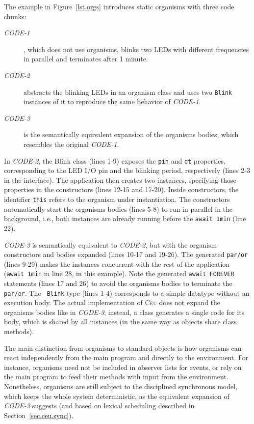 \documentclass{sigplanconf}
\newcommand{\CEU}{\textsc{C\'{e}u}\xspace}
\newcommand{\code}[1] {{\small{\texttt{#1}}}}
\newcommand{\1}{\;}
\newcommand{\2}{\;\;}
\newcommand{\3}{\;\;\;}
\newcommand{\5}{\;\;\;\;\;}
\begin{document}
The example in Figure~\ref{lst.orgs} introduces static organisms with three 
code chunks:
%
\begin{description}
\item[\emph{CODE-1}], which does not use organisms, blinks two LEDs with 
different frequencies in parallel and terminates after 1 minute.
%
\item[\emph{CODE-2}] abstracts the blinking LEDs in an organism class and uses 
two \code{Blink} instances of it to reproduce the same behavior of 
\emph{CODE-1}.
%
\item[\emph{CODE-3}] is the semantically equivalent expansion of the organisms 
bodies, which resembles the original \emph{CODE-1}.
\end{description}
%
In \emph{CODE-2}, the Blink class (lines 1-9) exposes the \code{pin} and 
\code{dt} properties, corresponding to the LED I/O pin and the blinking period, 
respectively (lines 2-3 in the interface).
The application then creates two instances, specifying those properties in the 
constructors (lines 12-15 and 17-20).
Inside constructors, the identifier \code{this} refers to the organism under 
instantiation.
The constructors automatically start the organisms bodies (lines 5-8) to run in 
parallel in the background, i.e., both instances are already running before the 
\code{await 1min} (line 22).

\emph{CODE-3} is semantically equivalent to \emph{CODE-2}, but with the 
organism constructors and bodies expanded (lines 10-17 and 19-26).
The generated \code{par/or} (lines 9-29) makes the instances concurrent with 
the rest of the application (\code{await 1min} in line 28, in this example).
Note the generated \code{await FOREVER} statements (lines 17 and 26) to avoid 
the organisms bodies to terminate the \code{par/or}.
The \code{\_Blink} type (lines 1-4) corresponds to a simple datatype without an
execution body.
%
The actual implementation of \CEU does not expand the organisms bodies like in 
\emph{CODE-3}; instead, a class generates a single code for its body, which is 
shared by all instances (in the same way as objects share class methods).

The main distinction from organisms to standard objects is how organisms can 
react independently from the main program and directly to the environment.
%
For instance, organisms need not be included in observer lists for events, or 
rely on the main program to feed their methods with input from the environment.
%
Nonetheless, organisms are still subject to the disciplined synchronous model, 
which keeps the whole system deterministic, as the equivalent expansion of 
\emph{CODE-3} suggests (and based on lexical scheduling described in 
Section~\ref{sec.ceu.sync}).
%
\end{document}
